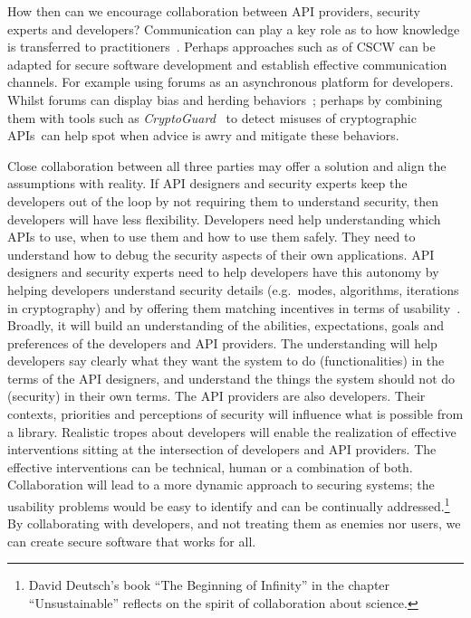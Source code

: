 \documentclass[conference]{IEEEtran}
\begin{document}
How then can we encourage collaboration between API providers, security experts and developers?  Communication can play a key role as to how knowledge is transferred to practitioners~\cite{claeys2019}. Perhaps approaches such as of \acl{CSCW} can be adapted for secure software development and establish effective communication channels. For example using forums as an asynchronous platform for developers. Whilst forums can display bias and herding behaviors~\cite{emmasurface2020}; perhaps by combining them with tools such as \emph{CryptoGuard}~\cite{rahaman2018tutorial} to  detect misuses of cryptographic APIs~can help spot when advice is awry and mitigate these behaviors.

Close collaboration between all three parties may offer a solution and  align the assumptions with reality. If API designers and security experts keep the developers out of the loop by not requiring them to understand security, then developers will have less flexibility. Developers need help understanding which APIs to use, when to use them and how to use them safely. They need to understand how to debug the security aspects of their own applications.  API designers and security experts need to help developers have this autonomy by helping developers understand security details (e.g.~modes, algorithms, iterations in cryptography) and by offering them matching incentives in terms of usability~\cite{aside2012,weir2020,tahaei2021sat}. Broadly, it will build an understanding of the abilities, expectations, goals and preferences of the developers and API providers. The understanding will help developers say clearly what they want the system to do (functionalities) in the terms of the API designers, and understand the things the system should not do (security) in their own terms.  The API providers are also developers. Their contexts, priorities and perceptions of security will influence what is possible from a library. Realistic tropes about developers will enable the realization of effective interventions sitting at the intersection of developers and API providers. The effective interventions can be technical, human or a combination of both. Collaboration will lead to a more dynamic approach to securing systems; the usability problems would be easy to identify and can be continually addressed.\footnote{David Deutsch's book ``The Beginning of Infinity'' in the chapter ``Unsustainable'' reflects on the spirit of collaboration about science.} By collaborating with developers, and not treating them as enemies nor users, we can create secure software that works for all.

\balance


\end{document}
